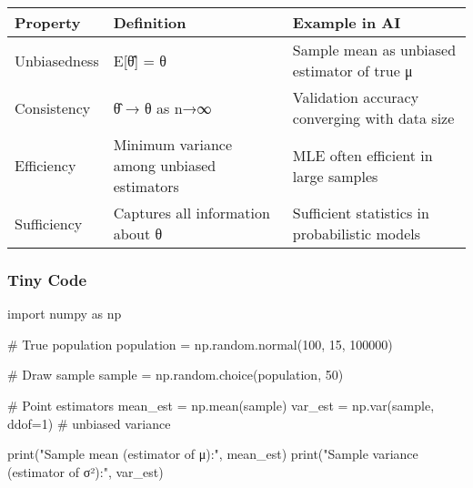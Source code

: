 \documentclass[
  letterpaper,
  DIV=11,
  numbers=noendperiod]{scrreprt}
\newenvironment{Shaded}{\begin{snugshade}}{\end{snugshade}}
\newcommand{\BuiltInTok}[1]{\textcolor[rgb]{0.00,0.23,0.31}{#1}}
\newcommand{\CommentTok}[1]{\textcolor[rgb]{0.37,0.37,0.37}{#1}}
\newcommand{\DecValTok}[1]{\textcolor[rgb]{0.68,0.00,0.00}{#1}}
\newcommand{\ImportTok}[1]{\textcolor[rgb]{0.00,0.46,0.62}{#1}}
\newcommand{\NormalTok}[1]{\textcolor[rgb]{0.00,0.23,0.31}{#1}}
\newcommand{\OperatorTok}[1]{\textcolor[rgb]{0.37,0.37,0.37}{#1}}
\newcommand{\StringTok}[1]{\textcolor[rgb]{0.13,0.47,0.30}{#1}}
\begin{document}
\begin{longtable}[]{@{}
  >{\raggedright\arraybackslash}p{}
  >{\raggedright\arraybackslash}p{}
  >{\raggedright\arraybackslash}p{}@{}}
\toprule\noalign{}
\begin{minipage}[b]{\linewidth}\raggedright
Property
\end{minipage} & \begin{minipage}[b]{\linewidth}\raggedright
Definition
\end{minipage} & \begin{minipage}[b]{\linewidth}\raggedright
Example in AI
\end{minipage} \\
\midrule\noalign{}
\endhead
\bottomrule\noalign{}
\endlastfoot
Unbiasedness & E{[}θ̂{]} = θ & Sample mean as unbiased estimator of true
μ \\
Consistency & θ̂ → θ as n→∞ & Validation accuracy converging with data
size \\
Efficiency & Minimum variance among unbiased estimators & MLE often
efficient in large samples \\
Sufficiency & Captures all information about θ & Sufficient statistics
in probabilistic models \\
\end{longtable}

\subsubsection{Tiny Code}\label{tiny-code-132}

\begin{Shaded}
\begin{Highlighting}[]
\ImportTok{import}\NormalTok{ numpy }\ImportTok{as}\NormalTok{ np}

\CommentTok{\# True population}
\NormalTok{population }\OperatorTok{=}\NormalTok{ np.random.normal(}\DecValTok{100}\NormalTok{, }\DecValTok{15}\NormalTok{, }\DecValTok{100000}\NormalTok{)}

\CommentTok{\# Draw sample}
\NormalTok{sample }\OperatorTok{=}\NormalTok{ np.random.choice(population, }\DecValTok{50}\NormalTok{)}

\CommentTok{\# Point estimators}
\NormalTok{mean\_est }\OperatorTok{=}\NormalTok{ np.mean(sample)}
\NormalTok{var\_est }\OperatorTok{=}\NormalTok{ np.var(sample, ddof}\OperatorTok{=}\DecValTok{1}\NormalTok{)  }\CommentTok{\# unbiased variance}

\BuiltInTok{print}\NormalTok{(}\StringTok{"Sample mean (estimator of μ):"}\NormalTok{, mean\_est)}
\BuiltInTok{print}\NormalTok{(}\StringTok{"Sample variance (estimator of σ²):"}\NormalTok{, var\_est)}
\end{Highlighting}
\end{Shaded}
\end{document}
